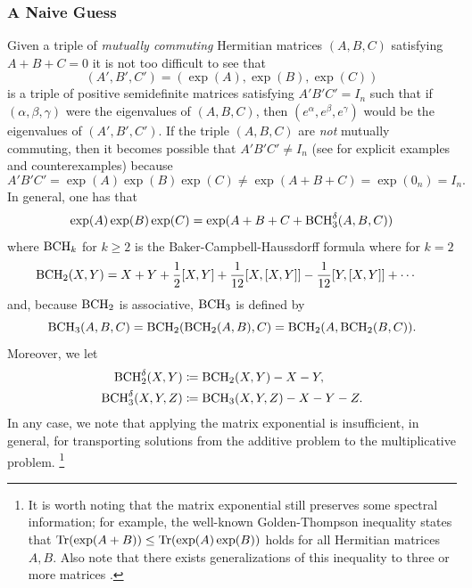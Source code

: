 \documentclass[notitlepage]{article}
\begin{document}
\subsubsection{A Naive Guess}

Given a triple of \textit{mutually commuting} Hermitian matrices $(A, B, C)$ satisfying $A+B+C=0$ it is not too difficult to see that
\begin{equation}
    (A', B', C') = (\exp(A), \exp(B), \exp(C))
\end{equation}
is a triple of positive semidefinite matrices satisfying $A'B'C' = I_n$ such that if $(\alpha, \beta, \gamma)$ were the eigenvalues of $(A,B,C)$, then $(e^{\alpha}, e^{\beta}, e^{\gamma})$ would be the eigenvalues of $(A', B', C')$.
If the triple $(A,B,C)$ are \textit{not} mutually commuting, then it becomes possible that $A'B'C' \neq I_n$ (see \cite[Example 3,31]{hess2020examination} for explicit examples and counterexamples) because
\begin{equation}
    A'B'C' = \exp(A)\exp(B)\exp(C) \neq \exp(A+B+C) = \exp(0_n) = I_n.
\end{equation}
In general, one has that 
\begin{equation}
    \exp(A)\exp(B)\exp(C) = \exp(A+B+C+\operatorname{BCH}_3^{\delta}(A,B,C))
\end{equation}
where $\operatorname{BCH}_k$ for $k \geq 2$ is the Baker-Campbell-Haussdorff formula where for $k = 2$
\begin{align}
    \operatorname{BCH}_2(X,Y) 
    &= X + Y + \frac{1}{2}[X,Y] + \frac{1}{12}[X,[X,Y]] - \frac{1}{12}[Y, [X,Y]] + \cdots
\end{align}
and, because $\operatorname{BCH}_2$ is associative, $\operatorname{BCH}_3$ is defined by
\begin{equation}
    \operatorname{BCH}_3(A,B,C) = \operatorname{BCH}_2(\operatorname{BCH}_2(A,B),C) = \operatorname{BCH}_2(A, \operatorname{BCH}_2(B,C)).
\end{equation}
Moreover, we let 
\begin{align}
    \operatorname{BCH}_2^{\delta}(X,Y) &\coloneqq \operatorname{BCH}_2(X,Y)-X-Y, \\
    \operatorname{BCH}_3^{\delta}(X,Y,Z) &\coloneqq \operatorname{BCH}_3(X,Y,Z)-X-Y-Z.
\end{align}
In any case, we note that applying the matrix exponential is insufficient, in general, for transporting solutions from the additive problem to the multiplicative problem.%
\footnote{
    It is worth noting that the matrix exponential still preserves some spectral information; for example, the well-known Golden-Thompson inequality states that $\operatorname{Tr}(\exp(A+B)) \leq \operatorname{Tr}(\exp(A)\exp(B))$ holds for all Hermitian matrices $A,B$.
    Also note that there exists generalizations of this inequality to three or more matrices \cite{sutter2017multivariate}.
}
\end{document}
